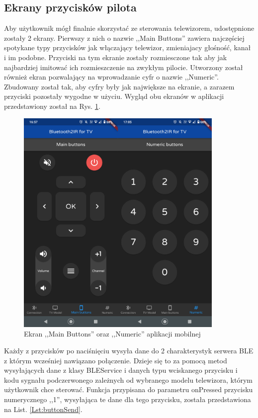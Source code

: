 \documentclass[12pt,twoside]{article}
\begin{document}
\subsection{Ekrany przycisków pilota}
Aby użytkownik mógł finalnie skorzystać ze sterowania telewizorem, udostępnione zostały 2 ekrany. Pierwszy z nich o nazwie ,,Main Buttons'' zawiera najczęściej spotykane typy przycisków jak włączający telewizor, zmieniajacy głośność, kanał i im podobne. Przyciski na tym ekranie zostały rozmiesczone tak aby jak najbardziej imitować ich rozmieszczenie na zwykłym pilocie. 
Utworzony został również ekran pozwalający na wprowadzanie cyfr o nazwie ,,Numeric''. Zbudowany został tak, aby cyfry były jak największe na ekranie, a zarazem przyciski pozostały wygodne w użyciu. Wygląd obu ekranów w aplikacji przedstawiony został na Rys. \ref*{Fig:buttonScreens}.

\begin{figure}[ht]
   \centering
   \includegraphics[width=10cm]{images/buttonScreens.png}
   \caption{Ekran ,,Main Buttons'' oraz ,,Numeric'' aplikacji mobilnej}
   \label{Fig:buttonScreens}
\end{figure}

Każdy z przycisków po naciśnięciu wysyła dane do 2 charakterystyk serwera BLE z którym wcześniej nawiązano połączenie. Dzieje się to za pomocą metod wysyłających dane z klasy BLEService i danych typu wciskanego przycisku i kodu sygnału podczerwonego zależnych od wybranego modelu telewizora, którym użytkownik chce sterować. Funkcja przypisana do parametru onPressed przycisku numerycznego ,,1'', wysyłająca te dane dla tego przycisku, została przedstawiona na List. \ref*{Lst:buttonSend}.
\end{document}
